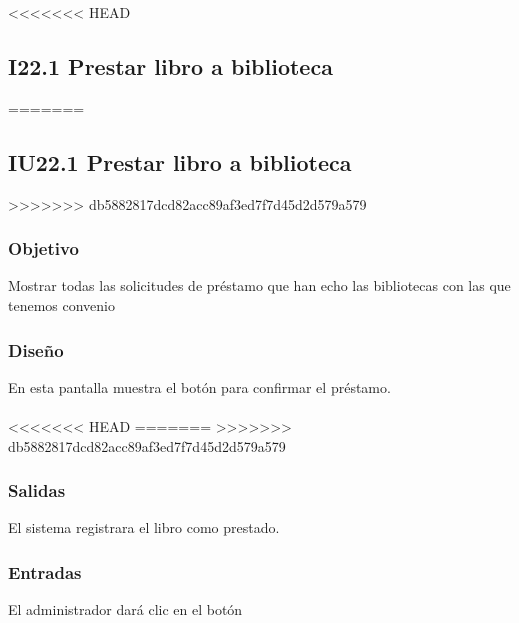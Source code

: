 \newpage
<<<<<<< HEAD
\subsection{I22.1 Prestar libro a biblioteca}
=======
\subsection{IU22.1 Prestar libro a biblioteca}
>>>>>>> db5882817dcd82acc89af3ed7f7d45d2d579a579

\subsubsection{Objetivo}
	Mostrar todas las solicitudes de préstamo que han echo las bibliotecas con las que tenemos convenio  

\subsubsection{Diseño}
	En esta pantalla muestra el botón  para confirmar el préstamo.  \\\\

<<<<<<< HEAD
=======
>>>>>>> db5882817dcd82acc89af3ed7f7d45d2d579a579

\subsubsection{Salidas}
	\begin{Citemize}
		\item El sistema registrara el libro como prestado. 
	\end{Citemize}
	
\subsubsection{Entradas}
	\begin{Citemize}
		\item El administrador dará clic en el botón 
	\end{Citemize}


